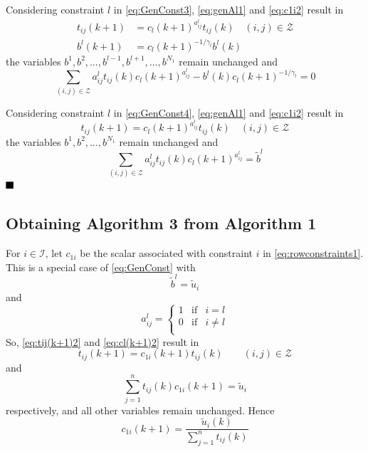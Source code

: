 \documentclass[twocolumn]{article}
\def\qed{ \rule{.1in}{.1in}}
\begin{document}
Considering  constraint $l$ in \eqref{eq:GenConst3},
\eqref{eq:genAl1} and \eqref{eq:c1i2}
result in
$$
\begin{aligned}
t_{ij}(k+1) &= c_{l}(k+1)^{a^l_{ij}}  t_{ij}(k) \quad (i, j) \in {\mathcal Z}\\
b^l(k+1) &= c_{l}(k+1)^{-1/\gamma_l} b^l(k)
\end{aligned}
$$
the variables $b^1, b^2, \dots,  b^{l-1}, b^{l+1}, \dots,b^{N_1}$ remain unchanged
and
\begin{equation*}
 \sum_{(i,j) \in {\mathcal Z}} a^l_{ij} t_{ij}(k)c_{l}(k+1)^{a^l_{ij}}   -b^l(k)c_{l}(k+1)^{-1/\gamma_l} =0
 \end{equation*}
 
Considering  constraint $l$ in \eqref{eq:GenConst4},
\eqref{eq:genAl1} and \eqref{eq:c1i2}
result in
$$ 
t_{ij}(k+1) = c_{l}(k+1)^{a^l_{ij}}  t_{ij}(k) \quad (i, j) \in {\mathcal Z}
$$
the variables $b^1, b^2, \dots,b^{N_1}$ remain unchanged
and
\begin{equation*}
 \sum_{(i,j) \in {\mathcal Z}} a^l_{ij} t_{ij}(k) c_{l}(k+1)^{a^l_{ij}}   = \tilde{b}^l
\end{equation*}
$\qed$


\subsection{Obtaining Algorithm 3 from Algorithm 1}
\label{sec:3from1}

For $i\in \mathcal{I}$, let $c_{1i}$ 
be the
scalar associated with   constraint $i$ in \eqref{eq:rowconstraints1}.
This is a special case of \eqref{eq:GenConst} with
\begin{equation}
\label{eq:bl2}
\tilde{b}^l = \tilde{u}_i
\end{equation}
and
\begin{equation}
\label{eq:alij2}
a^l_{ij} = \left\{ \begin{array}{rcl}
1 &\text{if} & i=l  \\
0 &\text{if} & i \neq l  \\
\end{array} \right.
\end{equation}
So,
\eqref{eq:tij(k+1)2} and \eqref{eq:cl(k+1)2}  result in
\begin{equation}
\label{eq:lem3result2}
t_{ij}(k+1) = c_{1i}(k+1)t_{ij}(k) \qquad (i, j) \in {\mathcal Z} 
\end{equation}
and
\begin{equation*}
\sum_{j=1}^n t_{ij}(k) c_{1i}(k+1) = \tilde{u}_i
\end{equation*}
respectively,
and
all other variables remain unchanged.
Hence
\begin{equation}
\label{eq:c1i02}
 c_{1i}(k+1)= \frac{\tilde{u}_i(k)}{\sum_{j=1}^n t_{ij}(k)}
\end{equation}
\end{document}
